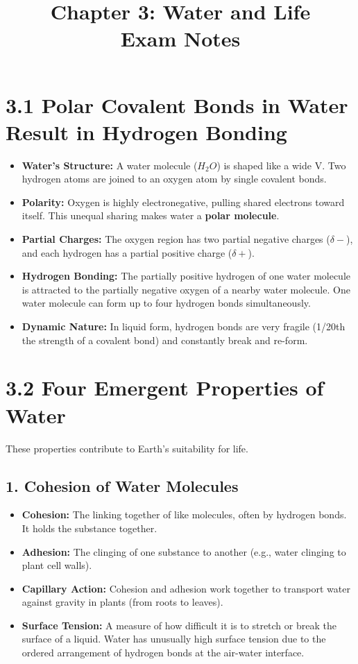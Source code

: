 \documentclass[11pt, a4paper]{article}
\title{\textbf{Chapter 3: Water and Life \\ Exam Notes}}
\author{}
\date{}
\begin{document}
\maketitle

\section*{3.1 Polar Covalent Bonds in Water Result in Hydrogen Bonding}
\begin{itemize}
    \item \textbf{Water's Structure:} A water molecule ($H_2O$) is shaped like a wide V. Two hydrogen atoms are joined to an oxygen atom by single covalent bonds.
    \item \textbf{Polarity:} Oxygen is highly electronegative, pulling shared electrons toward itself. This unequal sharing makes water a \textbf{polar molecule}.
    \item \textbf{Partial Charges:} The oxygen region has two partial negative charges ($\delta-$), and each hydrogen has a partial positive charge ($\delta+$).
    \item \textbf{Hydrogen Bonding:} The partially positive hydrogen of one water molecule is attracted to the partially negative oxygen of a nearby water molecule. One water molecule can form up to four hydrogen bonds simultaneously.
    \item \textbf{Dynamic Nature:} In liquid form, hydrogen bonds are very fragile (1/20th the strength of a covalent bond) and constantly break and re-form.
\end{itemize}

\section*{3.2 Four Emergent Properties of Water}
These properties contribute to Earth's suitability for life.

\subsection*{1. Cohesion of Water Molecules}
\begin{itemize}
    \item \textbf{Cohesion:} The linking together of like molecules, often by hydrogen bonds. It holds the substance together.
    \item \textbf{Adhesion:} The clinging of one substance to another (e.g., water clinging to plant cell walls).
    \item \textbf{Capillary Action:} Cohesion and adhesion work together to transport water against gravity in plants (from roots to leaves).
    \item \textbf{Surface Tension:} A measure of how difficult it is to stretch or break the surface of a liquid. Water has unusually high surface tension due to the ordered arrangement of hydrogen bonds at the air-water interface.
\end{itemize}
\end{document}
